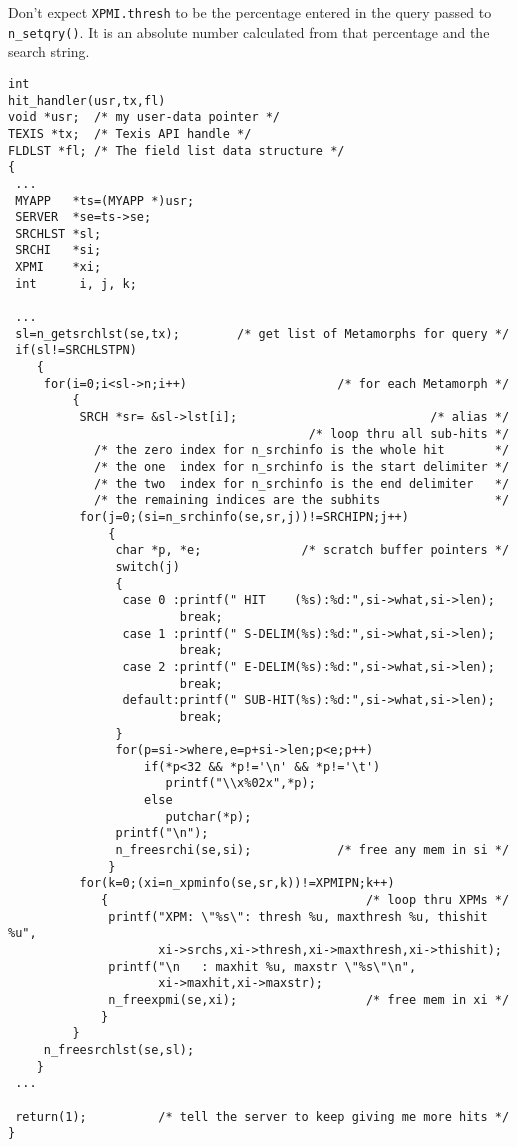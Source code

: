 \CAVEATS

Don't expect \verb`XPMI.thresh` to be the percentage entered in the
query passed to \verb`n_setqry()`.  It is an absolute number calculated
from that percentage and the search string.

\EXAMPLE
\begin{verbatim}
int
hit_handler(usr,tx,fl)
void *usr;  /* my user-data pointer */
TEXIS *tx;  /* Texis API handle */
FLDLST *fl; /* The field list data structure */
{
 ...
 MYAPP   *ts=(MYAPP *)usr;
 SERVER  *se=ts->se;
 SRCHLST *sl;
 SRCHI   *si;
 XPMI    *xi;
 int      i, j, k;

 ...
 sl=n_getsrchlst(se,tx);        /* get list of Metamorphs for query */
 if(sl!=SRCHLSTPN)
    {
     for(i=0;i<sl->n;i++)                     /* for each Metamorph */
         {
          SRCH *sr= &sl->lst[i];                           /* alias */
                                          /* loop thru all sub-hits */
            /* the zero index for n_srchinfo is the whole hit       */
            /* the one  index for n_srchinfo is the start delimiter */
            /* the two  index for n_srchinfo is the end delimiter   */
            /* the remaining indices are the subhits                */
          for(j=0;(si=n_srchinfo(se,sr,j))!=SRCHIPN;j++)
              {
               char *p, *e;              /* scratch buffer pointers */
               switch(j)
               {
                case 0 :printf(" HIT    (%s):%d:",si->what,si->len);
                        break;
                case 1 :printf(" S-DELIM(%s):%d:",si->what,si->len);
                        break;
                case 2 :printf(" E-DELIM(%s):%d:",si->what,si->len);
                        break;
                default:printf(" SUB-HIT(%s):%d:",si->what,si->len);
                        break;
               }
               for(p=si->where,e=p+si->len;p<e;p++)
                   if(*p<32 && *p!='\n' && *p!='\t')
                      printf("\\x%02x",*p);
                   else
                      putchar(*p);
               printf("\n");
               n_freesrchi(se,si);            /* free any mem in si */
              }
          for(k=0;(xi=n_xpminfo(se,sr,k))!=XPMIPN;k++)
             {                                    /* loop thru XPMs */
              printf("XPM: \"%s\": thresh %u, maxthresh %u, thishit %u",
                     xi->srchs,xi->thresh,xi->maxthresh,xi->thishit);
              printf("\n   : maxhit %u, maxstr \"%s\"\n",
                     xi->maxhit,xi->maxstr);
              n_freexpmi(se,xi);                  /* free mem in xi */
             }
         }
     n_freesrchlst(se,sl);
    }
 ...

 return(1);          /* tell the server to keep giving me more hits */
}
\end{verbatim}

